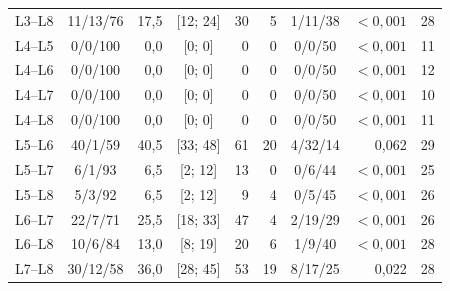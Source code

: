 {\begin{longtable}{lcrcrrcrr}
    L3--L8 & 11/13/76 & 17,5 & [12; 24] & 30 & 5 & 1/11/38 & $<0{,}001$ & 28 \\
    L4--L5 & 0/0/100 & 0,0 & [0; 0] & 0 & 0 & 0/0/50 & $<0{,}001$ & 11 \\
    L4--L6 & 0/0/100 & 0,0 & [0; 0] & 0 & 0 & 0/0/50 & $<0{,}001$ & 12 \\
    L4--L7 & 0/0/100 & 0,0 & [0; 0] & 0 & 0 & 0/0/50 & $<0{,}001$ & 10 \\
    L4--L8 & 0/0/100 & 0,0 & [0; 0] & 0 & 0 & 0/0/50 & $<0{,}001$ & 11 \\
    L5--L6 & 40/1/59 & 40,5 & [33; 48] & 61 & 20 & 4/32/14 & 0,062 & 29 \\
    L5--L7 & 6/1/93 & 6,5 & [2; 12] & 13 & 0 & 0/6/44 & $<0{,}001$ & 25 \\
    L5--L8 & 5/3/92 & 6,5 & [2; 12] & 9 & 4 & 0/5/45 & $<0{,}001$ & 26 \\
    L6--L7 & 22/7/71 & 25,5 & [18; 33] & 47 & 4 & 2/19/29 & $<0{,}001$ & 26 \\
    L6--L8 & 10/6/84 & 13,0 & [8; 19] & 20 & 6 & 1/9/40 & $<0{,}001$ & 28 \\
    L7--L8 & 30/12/58 & 36,0 & [28; 45] & 53 & 19 & 8/17/25 & 0,022 & 28 \\
\end{longtable}
}
